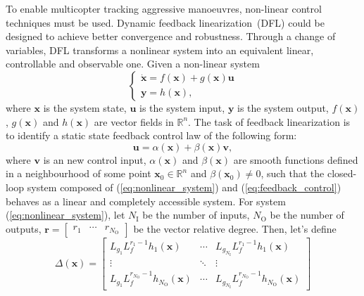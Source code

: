 \documentclass[letterpaper, 10 pt, conference]{ieeeconf}  %
\begin{document}
To enable multicopter tracking aggressive manoeuvres, non-linear control techniques must be used. Dynamic feedback linearization~(DFL) could be designed to achieve better convergence and robustness. Through a change of variables, DFL transforms a nonlinear system into an equivalent linear, controllable and observable one.
Given a non-linear system
\begin{equation}
\begin{cases}
\dot{\mathbf{x}} = f(\mathbf{x}) + g(\mathbf{x}) \mathbf{u} \\
\mathbf{y} = h(\mathbf{x}),
\end{cases}
\label{eq:nonlinear_system}
\end{equation}
where $\mathbf{x}$ is the system state, $\mathbf{u}$ is the system input, $\mathbf{y}$ is the system output, $f(\mathbf{x})$, $g(\mathbf{x})$ and $h(\mathbf{x})$ are vector fields in $\mathbb{R}^n$. The task of feedback linearization is to identify a static state feedback control law of the following form:
\begin{equation}
\mathbf{u} = \alpha(\mathbf{x}) + \beta(\mathbf{x}) \mathbf{v},
\label{eq:feedback_control}
\end{equation}
where $\mathbf{v}$ is an new control input, $\alpha(\mathbf{x})$ and $\beta(\mathbf{x})$ are smooth functions defined in a neighbourhood of some point $\mathbf{x}_0 \in  \mathbb{R}^n$ and $\beta(\mathbf{x}_0) \neq 0$, such that the closed-loop system composed of (\ref{eq:nonlinear_system}) and (\ref{eq:feedback_control}) behaves as a linear and completely accessible system.
For system (\ref{eq:nonlinear_system}), let $N_\text{I}$ be the number of inputs, $N_\text{O}$ be the number of outputs, $\mathbf{r} = \begin{bmatrix}r_1 & \cdots & r_{N_\text{O}}\end{bmatrix}$ be the vector relative degree. Then, let's define
\begin{equation}
\Delta(\mathbf{x}) = \begin{bmatrix}
L_{g_1} L^{r_1 - 1}_f h_1(\mathbf{x}) & \cdots & L_{g_{N_\text{I}}} L^{r_1 - 1}_f h_1(\mathbf{x}) \\
\vdots & \ddots & \vdots \\
L_{g_1} L^{r_{N_\text{O}} - 1}_f h_{N_\text{O}}(\mathbf{x}) & \cdots & L_{g_{N_\text{I}}} L^{r_{N_\text{O}} - 1}_f h_{N_\text{O}}(\mathbf{x})
\end{bmatrix}
\label{eq:delta}
\end{equation}
\end{document}
